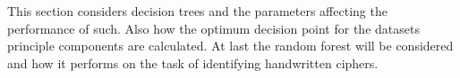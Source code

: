 This section considers decision trees and the parameters affecting the performance of such.
Also how the optimum decision point for the datasets principle components are calculated.
At last the random forest will be considered and how it performs on the task of identifying handwritten ciphers.

